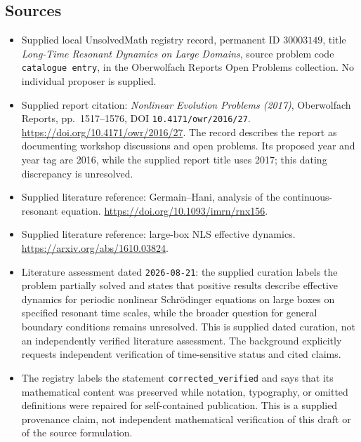 \documentclass[11pt]{article}
\begin{document}
\subsection{Sources}
\begin{itemize}
\item Supplied local UnsolvedMath registry record, permanent ID \(30003149\), title \emph{Long-Time Resonant Dynamics on Large Domains}, source problem code \texttt{catalogue entry}, in the Oberwolfach Reports Open Problems collection. No individual proposer is supplied.
\item Supplied report citation: \emph{Nonlinear Evolution Problems (2017)}, Oberwolfach Reports, pp.\ 1517--1576, DOI \texttt{10.4171/owr/2016/27}. \url{https://doi.org/10.4171/owr/2016/27}. The record describes the report as documenting workshop discussions and open problems. Its proposed year and year tag are 2016, while the supplied report title uses 2017; this dating discrepancy is unresolved.
\item Supplied literature reference: Germain--Hani, analysis of the continuous-resonant equation. \url{https://doi.org/10.1093/imrn/rnx156}.
\item Supplied literature reference: large-box NLS effective dynamics. \url{https://arxiv.org/abs/1610.03824}.
\item Literature assessment dated \texttt{2026-08-21}: the supplied curation labels the problem partially solved and states that positive results describe effective dynamics for periodic nonlinear Schr\"odinger equations on large boxes on specified resonant time scales, while the broader question for general boundary conditions remains unresolved. This is supplied dated curation, not an independently verified literature assessment. The background explicitly requests independent verification of time-sensitive status and cited claims.
\item The registry labels the statement \texttt{corrected\_verified} and says that its mathematical content was preserved while notation, typography, or omitted definitions were repaired for self-contained publication. This is a supplied provenance claim, not independent mathematical verification of this draft or of the source formulation.
\end{itemize}
\end{document}
